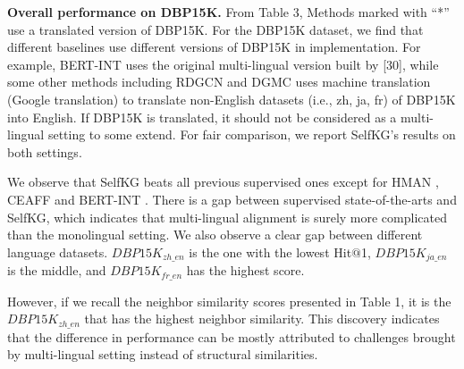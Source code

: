 \documentclass[sigconf]{acmart}
\begin{document}
{{\bfseries Overall performance on DBP15K.} From Table 3, Methods marked with “*” use a translated version of DBP15K. For the DBP15K dataset, we find that different baselines use different versions of DBP15K in implementation. For example, BERT-INT \cite{tang2020bert} uses the original multi-lingual version built by [30], while some other methods including RDGCN \cite{wu2019relation} and DGMC \cite{fey2020deep} uses machine translation (Google translation) to translate non-English datasets (i.e., zh, ja, fr) of DBP15K into English. If DBP15K is translated, it should not be considered as a multi-lingual setting to some extend. For fair comparison, we report SelfKG’s results on both settings.

We observe that SelfKG beats all previous supervised ones except for HMAN \cite{yang2019aligning}, CEAFF \cite{zeng2020collective} and BERT-INT \cite{tang2020bert}. There is a gap between supervised state-of-the-arts and SelfKG, which indicates that multi-lingual alignment is surely more complicated than the monolingual setting. We also observe a clear gap between different language datasets. $DBP15K_{zh\_en}$ is the one with the lowest Hit$@$1, $DBP15K_{ja\_en}$ is the middle, and $DBP15K_{fr\_en}$ has the highest score.

However, if we recall the neighbor similarity scores presented in Table 1, it is the $DBP15K_{zh\_en}$ that has the highest neighbor similarity. This discovery indicates that the difference in performance can be mostly attributed to challenges brought by multi-lingual setting instead of structural similarities.

}
\end{document}
